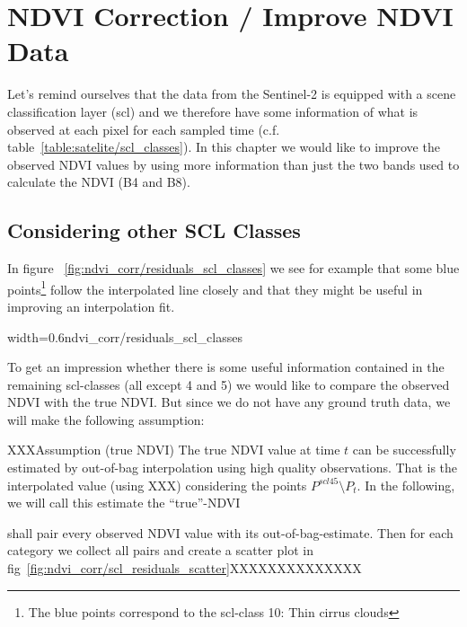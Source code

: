 \chapter{NDVI Correction / Improve NDVI Data}

Let's remind ourselves that the data from the Sentinel-2 is equipped with a scene classification layer (scl) and we therefore have some information of what is observed at each pixel for each sampled time (c.f. table~\ref{table:satelite/scl_classes}). In this chapter we would like to improve the observed NDVI values by using more information than just the two bands used to calculate the NDVI (B4 and B8).

\section{Considering other SCL Classes}
In figure ~\ref{fig:ndvi_corr/residuals_scl_classes} we see for example that some blue points\footnote{The blue points correspond to the scl-class 10: Thin cirrus clouds} follow the interpolated line closely and that they might be useful in improving an interpolation fit.

\begin{my_figure}[ht]{width=0.6\textwidth}{ndvi_corr/residuals_scl_classes}
    \caption{A smoothing splines fit considering green and yellow points (scl-classes 4 and 5)}
    \label{fig:ndvi_corr/residuals_scl_classes}
\end{my_figure}

To get an impression whether there is some useful information contained in the remaining scl-classes (all except 4 and 5) we would like to compare the observed NDVI with the true NDVI. But since we do not have any ground truth data, we will make the following assumption:


\begin{definition}{XXXAssumption (true NDVI)}
    The true NDVI value at time $t$ can be successfully estimated by out-of-bag interpolation using high quality observations. That is the interpolated value (using XXX) considering the points $P^{scl45}\setminus P_t$. In the following, we will call this estimate the ``true''-NDVI
\end{definition}

shall pair every observed NDVI value with its out-of-bag-estimate. Then for each category we collect all pairs and create a scatter plot in fig~\ref{fig:ndvi_corr/scl_residuals_scatter}XXXXXXXXXXXXXX



